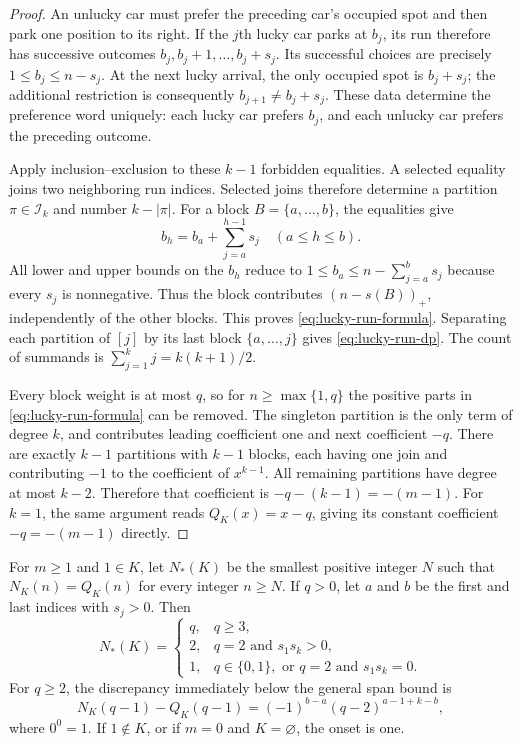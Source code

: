\documentclass[11pt,a4paper]{article}
\begin{document}
\begin{proof}
An unlucky car must prefer the preceding car's occupied spot and then park
one position to its right. If the $j$th lucky car parks at $b_j$, its run
therefore has successive outcomes
$b_j,b_j+1,\ldots,b_j+s_j$.
Its successful choices are precisely $1\leq b_j\leq n-s_j$.
At the next lucky arrival, the only occupied spot is $b_j+s_j$;
the additional restriction is consequently
$b_{j+1}\neq b_j+s_j$.
These data determine the preference word uniquely: each lucky car prefers
$b_j$, and each unlucky car prefers the preceding outcome.

Apply inclusion--exclusion to these $k-1$ forbidden equalities.
A selected equality joins two neighboring run indices. Selected joins
therefore determine a partition $\pi\in\mathcal I_k$ and number
$k-|\pi|$. For a block $B=\{a,\ldots,b\}$, the equalities give
\[
 b_h=b_a+\sum_{j=a}^{h-1}s_j\quad(a\leq h\leq b).
\]
All lower and upper bounds on the $b_h$ reduce to
$1\leq b_a\leq n-\sum_{j=a}^{b}s_j$ because every $s_j$ is
nonnegative. Thus the block contributes $(n-s(B))_+$, independently of
the other blocks. This proves \eqref{eq:lucky-run-formula}.
Separating each partition of $[j]$ by its last block $\{a,\ldots,j\}$
gives \eqref{eq:lucky-run-dp}. The count of summands is
$\sum_{j=1}^kj=k(k+1)/2$.

Every block weight is at most $q$, so for $n\geq\max\{1,q\}$ the
positive parts in \eqref{eq:lucky-run-formula} can be removed.
The singleton partition is the only term of degree $k$, and contributes
leading coefficient one and next coefficient $-q$.
There are exactly $k-1$ partitions with $k-1$ blocks, each having one
join and contributing $-1$ to the coefficient of $x^{k-1}$.
All remaining partitions have degree at most $k-2$.
Therefore that coefficient is $-q-(k-1)=-(m-1)$.
For $k=1$, the same argument reads $Q_K(x)=x-q$, giving its constant
coefficient $-q=-(m-1)$ directly.
\end{proof}

\begin{corollary}\label{cor:one-meter-exact-onset}
For $m\geq1$ and $1\in K$, let $N_*(K)$ be the smallest positive integer
$N$ such that $N_K(n)=Q_K(n)$ for every integer $n\geq N$.
If $q>0$, let $a$ and $b$ be the first and last indices with $s_j>0$.
Then
\begin{equation}\label{eq:one-meter-exact-onset}
 N_*(K)=
 \begin{cases}
 q,&q\geq3,\\
 2,&q=2\text{ and }s_1s_k>0,\\
 1,&q\in\{0,1\},\text{ or }q=2\text{ and }s_1s_k=0.
 \end{cases}
\end{equation}
For $q\geq2$, the discrepancy immediately below the general span bound is
\begin{equation}\label{eq:one-meter-onset-discrepancy}
 N_K(q-1)-Q_K(q-1)
 =(-1)^{b-a}(q-2)^{a-1+k-b},
\end{equation}
where $0^0=1$.
If $1\notin K$, or if $m=0$ and $K=\varnothing$, the onset is one.
\end{corollary}
\end{document}
